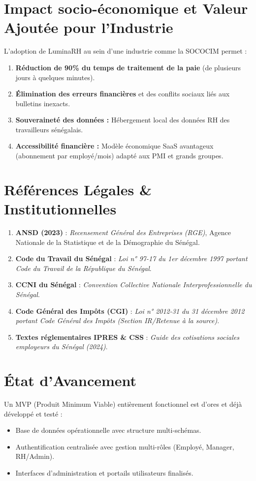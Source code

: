 \documentclass[11pt,a4paper]{article}
\begin{document}
\section{Impact socio-économique et Valeur Ajoutée pour l'Industrie}
L'adoption de LuminaRH au sein d'une industrie comme la SOCOCIM permet :
\begin{enumerate}[leftmargin=1.5em]
    \item \textbf{Réduction de 90\% du temps de traitement de la paie} (de plusieurs jours à quelques minutes).
    \item \textbf{Élimination des erreurs financières} et des conflits sociaux liés aux bulletins inexacts.
    \item \textbf{Souveraineté des données :} Hébergement local des données RH des travailleurs sénégalais.
    \item \textbf{Accessibilité financière :} Modèle économique SaaS avantageux (abonnement par employé/mois) adapté aux PMI et grands groupes.
\end{enumerate}

\section{Références Légales \& Institutionnelles}
\begin{small}
\begin{enumerate}[leftmargin=1.5em]
    \item \textbf{ANSD (2023)} : \textit{Recensement Général des Entreprises (RGE)}, Agence Nationale de la Statistique et de la Démographie du Sénégal.
    \item \textbf{Code du Travail du Sénégal} : \textit{Loi n° 97-17 du 1er décembre 1997 portant Code du Travail de la République du Sénégal}.
    \item \textbf{CCNI du Sénégal} : \textit{Convention Collective Nationale Interprofessionnelle du Sénégal}.
    \item \textbf{Code Général des Impôts (CGI)} : \textit{Loi n° 2012-31 du 31 décembre 2012 portant Code Général des Impôts (Section IR/Retenue à la source)}.
    \item \textbf{Textes réglementaires IPRES \& CSS} : \textit{Guide des cotisations sociales employeurs du Sénégal (2024)}.
\end{enumerate}
\end{small}

\section{État d'Avancement}
Un MVP (Produit Minimum Viable) entièrement fonctionnel est d'ores et déjà développé et testé :
\begin{itemize}
    \item Base de données opérationnelle avec structure multi-schémas.
    \item Authentification centralisée avec gestion multi-rôles (Employé, Manager, RH/Admin).
    \item Interfaces d'administration et portails utilisateurs finalisés.
\end{itemize}
\end{document}
